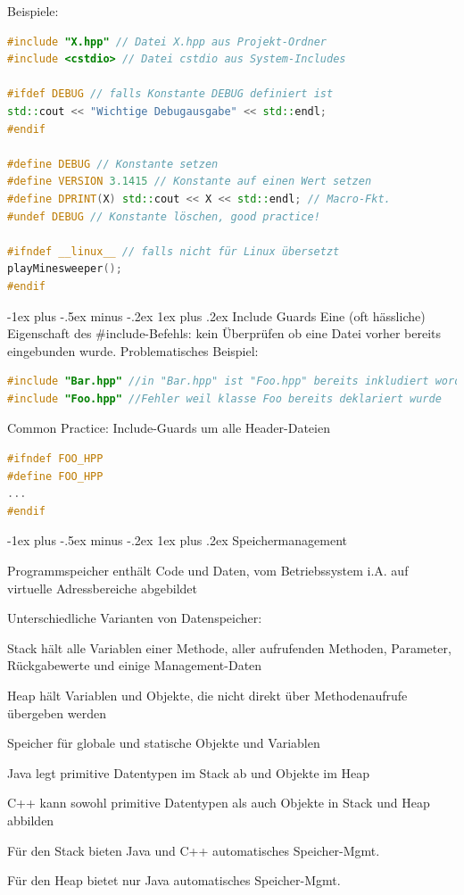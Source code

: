 \documentclass[10pt]{article}
\makeatletter
\renewcommand{\subsubsection}{\@startsection{subsubsection}{3}{0mm}%
                                {-1ex plus -.5ex minus -.2ex}%
                                {1ex plus .2ex}%
                                {\normalfont\small\bfseries}}
\makeatother
\begin{document}
Beispiele: 
\begin{lstlisting}[language=C++]
#include "X.hpp" // Datei X.hpp aus Projekt-Ordner
#include <cstdio> // Datei cstdio aus System-Includes

#ifdef DEBUG // falls Konstante DEBUG definiert ist
std::cout << "Wichtige Debugausgabe" << std::endl;
#endif

#define DEBUG // Konstante setzen
#define VERSION 3.1415 // Konstante auf einen Wert setzen
#define DPRINT(X) std::cout << X << std::endl; // Macro-Fkt.
#undef DEBUG // Konstante löschen, good practice!

#ifndef __linux__ // falls nicht für Linux übersetzt
playMinesweeper();
#endif
\end{lstlisting}

\subsubsection{Include Guards}
Eine (oft hässliche) Eigenschaft des \#include-Befehls: kein Überprüfen ob eine Datei vorher bereits eingebunden wurde. Problematisches Beispiel:
\begin{lstlisting}[language=C++]
#include "Bar.hpp" //in "Bar.hpp" ist "Foo.hpp" bereits inkludiert worden
#include "Foo.hpp" //Fehler weil klasse Foo bereits deklariert wurde
\end{lstlisting}

Common Practice: Include-Guards um alle Header-Dateien
\begin{lstlisting}[language=C++]
#ifndef FOO_HPP
#define FOO_HPP
...
#endif
\end{lstlisting}

\subsubsection{Speichermanagement}
\begin{itemize*}
  \item Programmspeicher enthält Code und Daten, vom Betriebssystem i.A. auf virtuelle Adressbereiche abgebildet
  \item Unterschiedliche Varianten von Datenspeicher:
  \begin{itemize*}
    \item Stack hält alle Variablen einer Methode, aller aufrufenden Methoden, Parameter, Rückgabewerte und einige Management-Daten
    \item Heap hält Variablen und Objekte, die nicht direkt über Methodenaufrufe übergeben werden
    \item Speicher für globale und statische Objekte und Variablen
  \end{itemize*}
  \item Java legt primitive Datentypen im Stack ab und Objekte im Heap
  \item C++ kann sowohl primitive Datentypen als auch Objekte in Stack und Heap abbilden
  \item Für den Stack bieten Java und C++ automatisches Speicher-Mgmt.
  \item Für den Heap bietet nur Java automatisches Speicher-Mgmt.
\end{itemize*}
\end{document}
